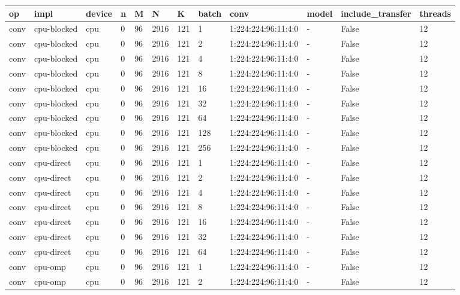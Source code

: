\begin{tabular}{llllllllllll}
\hline
op & impl & device & n & M & N & K & batch & conv & model & include\_transfer & threads \\
\hline
conv & cpu-blocked & cpu & 0 & 96 & 2916 & 121 & 1 & 1:224:224:96:11:4:0 & - & False & 12 \\
conv & cpu-blocked & cpu & 0 & 96 & 2916 & 121 & 2 & 1:224:224:96:11:4:0 & - & False & 12 \\
conv & cpu-blocked & cpu & 0 & 96 & 2916 & 121 & 4 & 1:224:224:96:11:4:0 & - & False & 12 \\
conv & cpu-blocked & cpu & 0 & 96 & 2916 & 121 & 8 & 1:224:224:96:11:4:0 & - & False & 12 \\
conv & cpu-blocked & cpu & 0 & 96 & 2916 & 121 & 16 & 1:224:224:96:11:4:0 & - & False & 12 \\
conv & cpu-blocked & cpu & 0 & 96 & 2916 & 121 & 32 & 1:224:224:96:11:4:0 & - & False & 12 \\
conv & cpu-blocked & cpu & 0 & 96 & 2916 & 121 & 64 & 1:224:224:96:11:4:0 & - & False & 12 \\
conv & cpu-blocked & cpu & 0 & 96 & 2916 & 121 & 128 & 1:224:224:96:11:4:0 & - & False & 12 \\
conv & cpu-blocked & cpu & 0 & 96 & 2916 & 121 & 256 & 1:224:224:96:11:4:0 & - & False & 12 \\
conv & cpu-direct & cpu & 0 & 96 & 2916 & 121 & 1 & 1:224:224:96:11:4:0 & - & False & 12 \\
conv & cpu-direct & cpu & 0 & 96 & 2916 & 121 & 2 & 1:224:224:96:11:4:0 & - & False & 12 \\
conv & cpu-direct & cpu & 0 & 96 & 2916 & 121 & 4 & 1:224:224:96:11:4:0 & - & False & 12 \\
conv & cpu-direct & cpu & 0 & 96 & 2916 & 121 & 8 & 1:224:224:96:11:4:0 & - & False & 12 \\
conv & cpu-direct & cpu & 0 & 96 & 2916 & 121 & 16 & 1:224:224:96:11:4:0 & - & False & 12 \\
conv & cpu-direct & cpu & 0 & 96 & 2916 & 121 & 32 & 1:224:224:96:11:4:0 & - & False & 12 \\
conv & cpu-direct & cpu & 0 & 96 & 2916 & 121 & 64 & 1:224:224:96:11:4:0 & - & False & 12 \\
conv & cpu-omp & cpu & 0 & 96 & 2916 & 121 & 1 & 1:224:224:96:11:4:0 & - & False & 12 \\
conv & cpu-omp & cpu & 0 & 96 & 2916 & 121 & 2 & 1:224:224:96:11:4:0 & - & False & 12 \\

\end{tabular}

